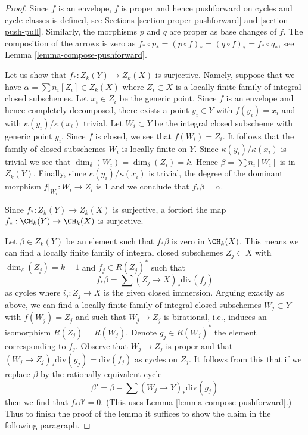 \begin{proof}
Since $f$ is an envelope, $f$ is proper and hence pushforward on
cycles and cycle classes is defined, see
Sections \ref{section-proper-pushforward} and \ref{section-push-pull}.
Similarly, the morphisms $p$ and $q$ are proper as base changes of $f$.
The composition of the arrows is zero as
$f_* \circ p_* = (p \circ f)_* = (q \circ f)_* = f_* \circ q_*$, see
Lemma \ref{lemma-compose-pushforward}.

\medskip\noindent
Let us show that $f_* : Z_k(Y) \to Z_k(X)$ is surjective.
Namely, suppose that we have $\alpha = \sum n_i[Z_i] \in Z_k(X)$
where $Z_i \subset X$ is a locally finite family of integral
closed subschemes. Let $x_i \in Z_i$ be the generic point.
Since $f$ is an envelope and hence completely decomposed,
there exists a point $y_i \in Y$ with $f(y_i) = x_i$
and with $\kappa(y_i)/\kappa(x_i)$ trivial. Let $W_i \subset Y$
be the integral closed subscheme with generic point $y_i$.
Since $f$ is closed, we see that $f(W_i) = Z_i$.
It follows that the family of closed subschemes $W_i$ is locally finite
on $Y$. Since $\kappa(y_i)/\kappa(x_i)$ is trivial we see
that $\dim_\delta(W_i) = \dim_\delta(Z_i) = k$. Hence
$\beta = \sum n_i[W_i]$ is in $Z_k(Y)$. Finally, since
$\kappa(y_i)/\kappa(x_i)$ is trivial, the degree of the dominant
morphism $f|_{W_i} : W_i \to Z_i$ is $1$ and we conclude
that $f_*\beta = \alpha$.

\medskip\noindent
Since $f_* : Z_k(Y) \to Z_k(X)$ is surjective, a fortiori the map
$f_* : \CH_k(Y) \to \CH_k(X)$ is surjective.

\medskip\noindent
Let $\beta \in Z_k(Y)$ be an element such that $f_*\beta$ is zero in
$\CH_k(X)$. This means we can find a locally finite family of
integral closed subschemes $Z_j \subset X$ with $\dim_\delta(Z_j) = k + 1$
and $f_j \in R(Z_j)^*$ such that
$$
f_*\beta = \sum (Z_j \to X)_*\text{div}(f_j)
$$
as cycles where $i_j : Z_j \to X$ is the given closed immersion.
Arguing exactly as above, we can find a locally finite
family of integral closed subschemes $W_j \subset Y$
with $f(W_j) = Z_j$ and such that $W_j \to Z_j$ is birational, i.e.,
induces an isomorphism $R(Z_j) = R(W_j)$. Denote $g_j \in R(W_j)^*$
the element corresponding to $f_j$. Observe that $W_j \to Z_j$
is proper and that $(W_j \to Z_j)_*\text{div}(g_j) = \text{div}(f_j)$
as cycles on $Z_j$. It follows from this that if we replace
$\beta$ by the rationally equivalent cycle
$$
\beta' = \beta - \sum (W_j \to Y)_*\text{div}(g_j)
$$
then we find that $f_*\beta' = 0$.
(This uses Lemma \ref{lemma-compose-pushforward}.)
Thus to finish the proof
of the lemma it suffices to show the claim in the following paragraph.


\end{proof}
